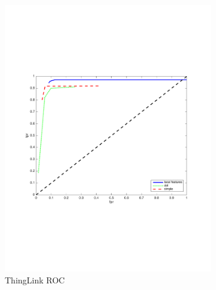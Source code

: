 \documentclass[english,12pt,a4paper,pdftex,elec,utf8, table]{aaltothesis}
\begin{document}
\begin{figure}[htb]
\begin{center}
\begin{subfigure}[b]{0.49\textwidth}
    \includegraphics[width=\textwidth]{figures/thinglink_53scaleROC.pdf}
    \caption{ThingLink ROC}
    \label{53pr}
  \end{subfigure}
  \begin{subfigure}[b]{0.49\textwidth}

\end{subfigure}
\end{center}
\end{figure}
\end{document}
